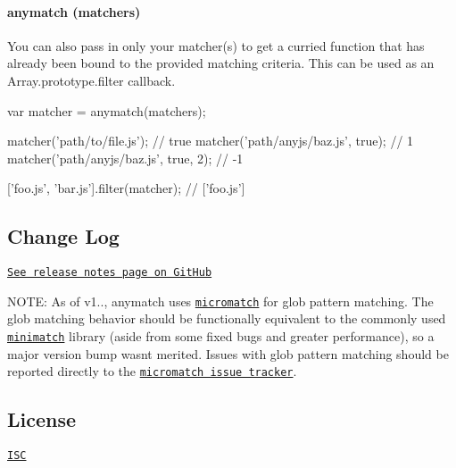 

\paragraph*{anymatch (matchers)}

You can also pass in only your matcher(s) to get a curried function that has already been bound to the provided matching criteria. This can be used as an {\ttfamily Array.\+prototype.\+filter} callback.


\begin{DoxyCode}
var matcher = anymatch(matchers);

matcher('path/to/file.js'); // true
matcher('path/anyjs/baz.js', true); // 1
matcher('path/anyjs/baz.js', true, 2); // -1

['foo.js', 'bar.js'].filter(matcher); // ['foo.js']
\end{DoxyCode}


\subsection*{Change Log }

\href{https://github.com/es128/anymatch/releases}{\tt See release notes page on Git\+Hub}

N\+O\+TE\+: As of v1.., anymatch uses \href{https://github.com/jonschlinkert/micromatch}{\tt micromatch} for glob pattern matching. The glob matching behavior should be functionally equivalent to the commonly used \href{https://github.com/isaacs/minimatch}{\tt minimatch} library (aside from some fixed bugs and greater performance), so a major version bump wasn\textquotesingle{}t merited. Issues with glob pattern matching should be reported directly to the \href{https://github.com/jonschlinkert/micromatch/issues}{\tt micromatch issue tracker}.

\subsection*{License }

\href{https://raw.github.com/es128/anymatch/master/LICENSE}{\tt I\+SC} 